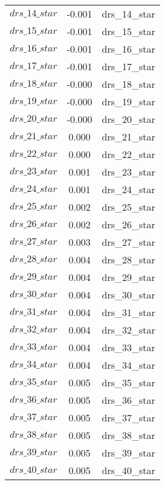 \begin{center}
\begin{longtable}{ccc}
$drs\_14\_star$ 	 & 	 -0.001 	 & 	 drs\_14\_star\\
$drs\_15\_star$ 	 & 	 -0.001 	 & 	 drs\_15\_star\\
$drs\_16\_star$ 	 & 	 -0.001 	 & 	 drs\_16\_star\\
$drs\_17\_star$ 	 & 	 -0.001 	 & 	 drs\_17\_star\\
$drs\_18\_star$ 	 & 	 -0.000 	 & 	 drs\_18\_star\\
$drs\_19\_star$ 	 & 	 -0.000 	 & 	 drs\_19\_star\\
$drs\_20\_star$ 	 & 	 -0.000 	 & 	 drs\_20\_star\\
$drs\_21\_star$ 	 & 	 0.000 	 & 	 drs\_21\_star\\
$drs\_22\_star$ 	 & 	 0.000 	 & 	 drs\_22\_star\\
$drs\_23\_star$ 	 & 	 0.001 	 & 	 drs\_23\_star\\
$drs\_24\_star$ 	 & 	 0.001 	 & 	 drs\_24\_star\\
$drs\_25\_star$ 	 & 	 0.002 	 & 	 drs\_25\_star\\
$drs\_26\_star$ 	 & 	 0.002 	 & 	 drs\_26\_star\\
$drs\_27\_star$ 	 & 	 0.003 	 & 	 drs\_27\_star\\
$drs\_28\_star$ 	 & 	 0.004 	 & 	 drs\_28\_star\\
$drs\_29\_star$ 	 & 	 0.004 	 & 	 drs\_29\_star\\
$drs\_30\_star$ 	 & 	 0.004 	 & 	 drs\_30\_star\\
$drs\_31\_star$ 	 & 	 0.004 	 & 	 drs\_31\_star\\
$drs\_32\_star$ 	 & 	 0.004 	 & 	 drs\_32\_star\\
$drs\_33\_star$ 	 & 	 0.004 	 & 	 drs\_33\_star\\
$drs\_34\_star$ 	 & 	 0.004 	 & 	 drs\_34\_star\\
$drs\_35\_star$ 	 & 	 0.005 	 & 	 drs\_35\_star\\
$drs\_36\_star$ 	 & 	 0.005 	 & 	 drs\_36\_star\\
$drs\_37\_star$ 	 & 	 0.005 	 & 	 drs\_37\_star\\
$drs\_38\_star$ 	 & 	 0.005 	 & 	 drs\_38\_star\\
$drs\_39\_star$ 	 & 	 0.005 	 & 	 drs\_39\_star\\
$drs\_40\_star$ 	 & 	 0.005 	 & 	 drs\_40\_star\\
\bottomrule%
\end{longtable}
\end{center}
